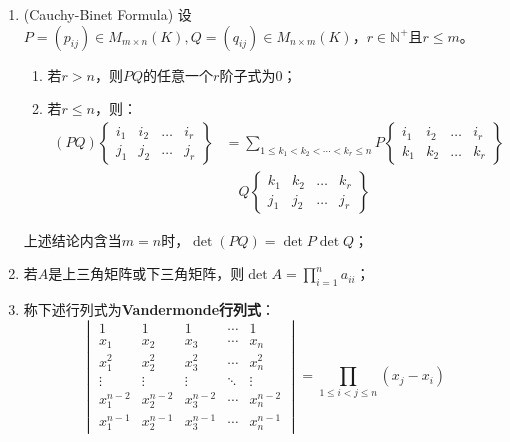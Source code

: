 \begin{property}
\begin{enumerate}
		\begin{align*}
			\det A&=\sum_{1\leqslant j_1<j_2<\cdots<j_k\leqslant n}A\left\{
			\begin{array}{*{4}{c}}
				i_1 & i_2,\dots & i_k \\
				j_1 & j_2,\dots & j_k
			\end{array}\right\} \\
			&\quad(-1)^{(i_1+i_2+\cdots+i_k)+(j_1+j_2+\cdots+j_k)}A\left\{
			\begin{array}{*{4}{c}}
				i_1' & i_2' & \dots & i_{n-k}' \\
				j_1' & j_2' & \dots & j_{n-k}'
			\end{array}\right\}
		\end{align*}
		\item (Cauchy-Binet Formula) 设$P=(p_{ij})\in M_{m\times n}(K),Q=(q_{ij})\in M_{n\times m}(K)$，$r\in\mathbb{N}^+$且$r\leqslant m$。
		\begin{enumerate}
			\item 若$r>n$，则$PQ$的任意一个$r$阶子式为$0$；
			\item 若$r\leqslant n$，则：
			\begin{align*}
				(PQ)\left\{
				\begin{array}{*{4}{c}}
					i_1 & i_2 & \dots & i_r \\
					j_1 & j_2 & \dots & j_r
				\end{array}\right\}&=\sum_{1\leqslant k_1<k_2<\cdots<k_r\leqslant n}P\left\{
				\begin{array}{*{4}{c}}
					i_1 & i_2 & \dots & i_r \\
					k_1 & k_2 & \dots & k_r
				\end{array}\right\} \\
				&\quad Q\left\{
				\begin{array}{*{4}{c}}
					k_1 & k_2 & \dots & k_r \\
					j_1 & j_2 & \dots & j_r
				\end{array}\right\}
			\end{align*}
		\end{enumerate}
		上述结论内含当$m=n$时，$\det(PQ)=\det P\det Q$；
		\item 若$A$是上三角矩阵或下三角矩阵，则$\det A=\prod\limits_{i=1}^na_{ii}$；
		\item 称下述行列式为\textbf{Vandermonde行列式}：
		\begin{equation*}
			\begin{vmatrix}
				1 & 1 & 1 & \cdots & 1 \\
				x_1 & x_2 & x_3 & \cdots & x_n \\
				x_1^2 & x_2^2 & x_3^2 & \cdots & x_n^2 \\
				\vdots & \vdots & \vdots & \ddots & \vdots \\
				x_1^{n-2} & x_2^{n-2} & x_3^{n-2} & \cdots & x_n^{n-2} \\
				x_1^{n-1} & x_2^{n-1} & x_3^{n-1} & \cdots & x_n^{n-1}
			\end{vmatrix}=\prod_{1\leqslant i<j\leqslant n}(x_j-x_i)
		\end{equation*}
	\end{enumerate}
\end{property}
